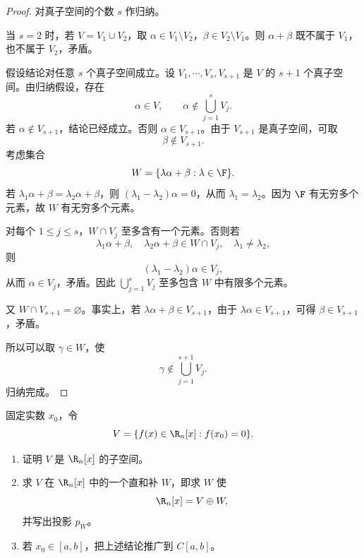 \begin{proof}
	对真子空间的个数 $s$ 作归纳。
	
	当 $s=2$ 时，若 $V=V_1\cup V_2$，取 $\alpha\in V_1\setminus V_2$，$\beta\in V_2\setminus V_1$。则 $\alpha+\beta$ 既不属于 $V_1$，也不属于 $V_2$，矛盾。
	
	假设结论对任意 $s$ 个真子空间成立。设 $V_1,\cdots,V_s,V_{s+1}$ 是 $V$ 的 $s+1$ 个真子空间。由归纳假设，存在
	\[
	\alpha\in V,
	\qquad
	\alpha\notin\bigcup_{j=1}^{s}V_j.
	\]
	若 $\alpha\notin V_{s+1}$，结论已经成立。否则 $\alpha\in V_{s+1}$。由于 $V_{s+1}$ 是真子空间，可取
	\[
	\beta\notin V_{s+1}.
	\]
	考虑集合
	\[
	W=\{\lambda\alpha+\beta:\lambda\in\F\}.
	\]
	若 $\lambda_1\alpha+\beta=\lambda_2\alpha+\beta$，则 $(\lambda_1-\lambda_2)\alpha=0$，从而 $\lambda_1=\lambda_2$。因为 $\F$ 有无穷多个元素，故 $W$ 有无穷多个元素。
	
	对每个 $1\leq j\leq s$，$W\cap V_j$ 至多含有一个元素。否则若
	\[
	\lambda_1\alpha+\beta,
	\quad
	\lambda_2\alpha+\beta\in W\cap V_j,
	\quad
	\lambda_1\neq\lambda_2,
	\]
	则
	\[
	(\lambda_1-\lambda_2)\alpha\in V_j,
	\]
	从而 $\alpha\in V_j$，矛盾。因此 $\bigcup_{j=1}^{s}V_j$ 至多包含 $W$ 中有限多个元素。
	
	又 $W\cap V_{s+1}=\varnothing$。事实上，若 $\lambda\alpha+\beta\in V_{s+1}$，由于 $\lambda\alpha\in V_{s+1}$，可得 $\beta\in V_{s+1}$，矛盾。
	
	所以可以取 $\gamma\in W$，使
	\[
	\gamma\notin\bigcup_{j=1}^{s+1}V_j.
	\]
	归纳完成。
\end{proof}

\begin{problem}
	固定实数 $x_0$，令
	\[
	V=\{f(x)\in\R_n[x]:f(x_0)=0\}.
	\]
	\begin{enumerate}
		\item 证明 $V$ 是 $\R_n[x]$ 的子空间。
		\item 求 $V$ 在 $\R_n[x]$ 中的一个直和补 $W$，即求 $W$ 使
		\[
		\R_n[x]=V\oplus W,
		\]
		并写出投影 $p_W$。
		\item 若 $x_0\in[a,b]$，把上述结论推广到 $C[a,b]$。
	\end{enumerate}
\end{problem}

